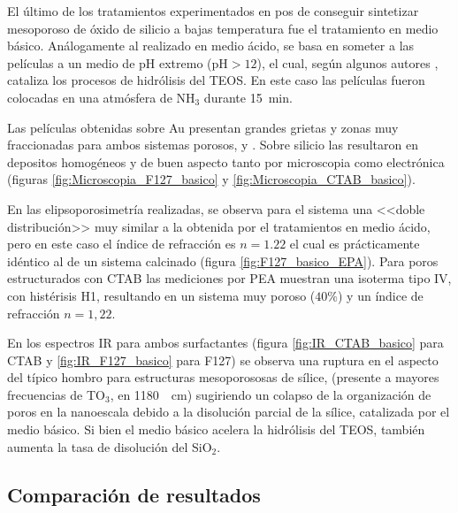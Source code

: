 	 	 El último de los tratamientos experimentados en pos de conseguir sintetizar mesoporoso de óxido de silicio a bajas temperatura fue el tratamiento en medio básico. Análogamente al realizado en medio ácido, se basa en someter a las películas a un medio de pH extremo (pH$>12$), el cual, según algunos autores \cite{Soler-Illia2011,Huo1996,Ichinose2002,GonzalezSolveyra2017}, cataliza los procesos de hidrólisis del TEOS. En este caso las películas fueron colocadas en una atmósfera de NH$_3$ durante \SI{15}{\minute}. 

		 Las películas obtenidas sobre Au presentan grandes grietas y zonas muy fraccionadas para ambos sistemas porosos, \pdmF\space y \pdmC. Sobre silicio las \pdm\space resultaron en depositos homogéneos y de buen aspecto tanto por microscopia como electrónica (figuras \ref{fig:Microscopia_F127_basico} y \ref{fig:Microscopia_CTAB_basico}).

		 En las elipsoporosimetría realizadas, se observa para el sistema \pdmF\space una <<doble distribución>> muy similar a la obtenida por el tratamientos en medio ácido, pero en este caso el índice de refracción es $n=1.22$ el cual es prácticamente idéntico al de un sistema calcinado (figura \ref{fig:F127_basico_EPA}). Para poros estructurados con CTAB las mediciones por PEA muestran una isoterma tipo IV, con histérisis H1, resultando en un sistema muy poroso ($40\%$) y un índice de refracción $n=1,22$.
	
		 En los espectros IR para ambos surfactantes (figura \ref{fig:IR_CTAB_basico} para CTAB y \ref{fig:IR_F127_basico} para F127) se observa una ruptura en el aspecto del típico hombro para estructuras mesoporososas de sílice\cite{Olsen1989,Innocenzi2003,Angelome2008}, (presente a mayores frecuencias de TO$_3$, en \SI{1180}{\per\cm}) sugiriendo un colapso de la organización de poros en la nanoescala debido a la disolución parcial de la sílice, catalizada por el medio básico. Si bien el medio básico acelera la hidrólisis del TEOS, también aumenta la tasa de disolución del SiO$_2$.\cite{Mazer1994,Niibori2000,Gorrepati2010}

	 \subsection{Comparación de resultados}
	 		
